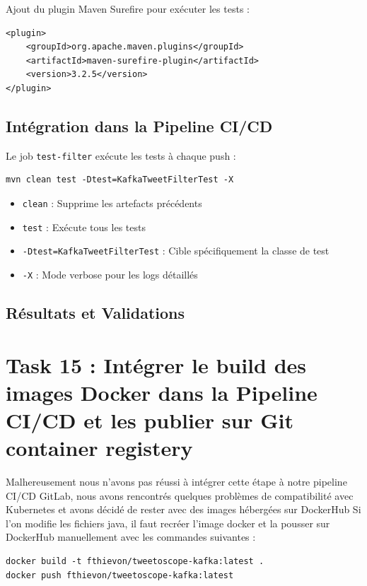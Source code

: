 \documentclass[10pt,a4paper]{article}
\begin{document}
Ajout du plugin Maven Surefire pour exécuter les tests :

\begin{verbatim}
<plugin>
    <groupId>org.apache.maven.plugins</groupId>
    <artifactId>maven-surefire-plugin</artifactId>
    <version>3.2.5</version>
</plugin>
\end{verbatim}

\subsection{Intégration dans la Pipeline CI/CD}

Le job \texttt{test-filter} exécute les tests à chaque push :

\begin{verbatim}
mvn clean test -Dtest=KafkaTweetFilterTest -X
\end{verbatim}

\begin{itemize}
    \item \texttt{clean} : Supprime les artefacts précédents
    \item \texttt{test} : Exécute tous les tests
    \item \texttt{-Dtest=KafkaTweetFilterTest} : Cible spécifiquement la classe de test
    \item \texttt{-X} : Mode verbose pour les logs détaillés
\end{itemize}

\subsection{Résultats et Validations}

\section{Task 15 : Intégrer le build des images Docker dans la Pipeline CI/CD et les publier sur Git container registery}

Malhereusement nous n'avons pas réussi à intégrer cette étape à notre pipeline CI/CD GitLab, nous avons rencontrés quelques problèmes de compatibilité avec Kubernetes et avons décidé de rester avec des images hébergées sur DockerHub
Si l'on modifie les fichiers java, il faut recréer l'image docker et la pousser sur DockerHub manuellement avec les commandes suivantes :
\begin{verbatim}
docker build -t fthievon/tweetoscope-kafka:latest .
docker push fthievon/tweetoscope-kafka:latest
\end{verbatim}
\end{document}
